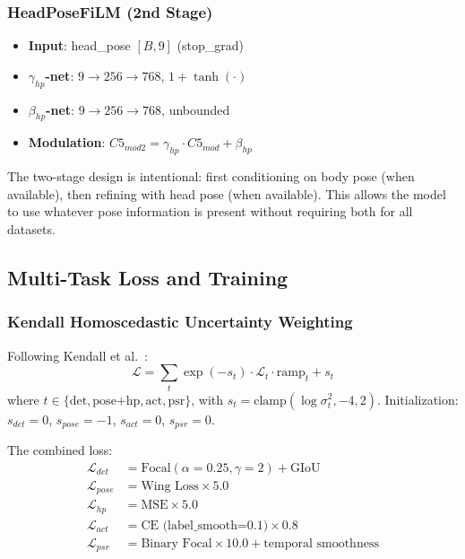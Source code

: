 \documentclass[10pt,twocolumn]{article}
\begin{document}
\subsubsection{HeadPoseFiLM (2nd Stage)}

\begin{itemize}[nosep]
\item \textbf{Input}: head\_pose $[B, 9]$ (stop\_grad)
\item \textbf{$\gamma_{hp}$-net}: $9 \rightarrow 256 \rightarrow 768$, $1 + \tanh(\cdot)$
\item \textbf{$\beta_{hp}$-net}: $9 \rightarrow 256 \rightarrow 768$, unbounded
\item \textbf{Modulation}: $C5_{mod2} = \gamma_{hp} \cdot C5_{mod} + \beta_{hp}$
\end{itemize}

The two-stage design is intentional: first conditioning on body pose (when available), then refining with head pose (when available). This allows the model to use whatever pose information is present without requiring both for all datasets.

\subsection{Multi-Task Loss and Training}

\subsubsection{Kendall Homoscedastic Uncertainty Weighting}

Following Kendall et al.~\cite{kendall2018multi}:
\begin{equation}
\mathcal{L} = \sum_{t} \exp(-s_t) \cdot \mathcal{L}_t \cdot \text{ramp}_t + s_t
\end{equation}
where $t \in \{\text{det}, \text{pose+hp}, \text{act}, \text{psr}\}$, with $s_t = \text{clamp}(\log \sigma^2_t, -4, 2)$. Initialization: $s_{det}=0$, $s_{pose}=-1$, $s_{act}=0$, $s_{psr}=0$.

The combined loss:
\begin{align*}
\mathcal{L}_{det} &= \text{Focal}(\alpha=0.25, \gamma=2) + \text{GIoU} \\
\mathcal{L}_{pose} &= \text{Wing Loss} \times 5.0 \\
\mathcal{L}_{hp} &= \text{MSE} \times 5.0 \\
\mathcal{L}_{act} &= \text{CE (label\_smooth=0.1)} \times 0.8 \\
\mathcal{L}_{psr} &= \text{Binary Focal} \times 10.0 + \text{temporal smoothness}
\end{align*}
\end{document}
